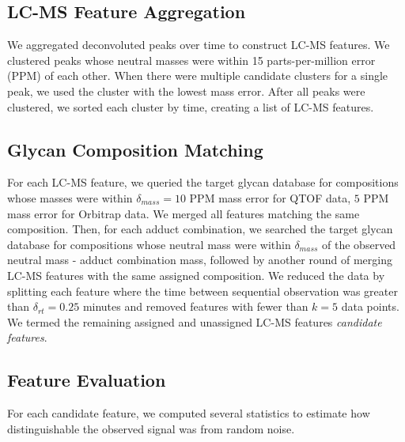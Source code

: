 \documentclass{article}
\begin{document}
\subsection{LC-MS Feature Aggregation}
We aggregated deconvoluted peaks over time to construct LC-MS features. We clustered
peaks whose neutral masses were within 15 parts-per-million error (PPM) of each other.
When there were multiple candidate clusters for a single peak, we used the cluster
with the lowest mass error. After all peaks were clustered, we sorted each cluster
by time, creating a list of LC-MS features.

\subsection{Glycan Composition Matching}
For each LC-MS feature, we queried the target glycan database for compositions whose
masses were within $\delta_{mass} = 10$ PPM mass error for QTOF data, $5$ PPM mass error
for Orbitrap data. We merged all features matching the same composition. Then, for
each adduct combination, we searched the target glycan database for compositions
whose neutral mass were within $\delta_{mass}$ of the observed neutral mass - adduct
combination mass, followed by another round of merging LC-MS features with the same
assigned composition. We reduced the data by splitting each feature where the time
between sequential observation was greater than $\delta_{rt} = 0.25$ minutes and
removed features with fewer than $k = 5$ data points. We termed the remaining assigned
and unassigned LC-MS features {\em candidate features}.

\subsection{Feature Evaluation}
For each candidate feature, we computed several statistics to estimate how distinguishable
the observed signal was from random noise.
\end{document}
